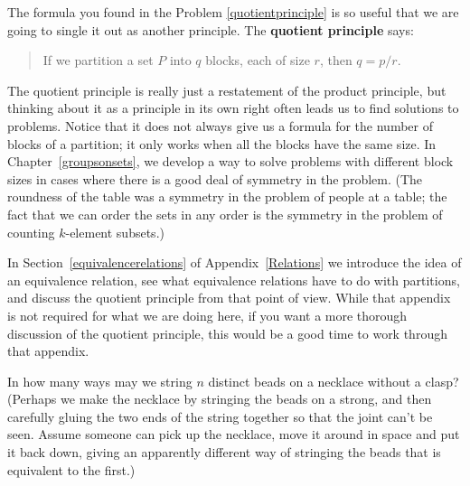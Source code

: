 The formula you found in the Problem \ref{quotientprinciple} is so useful that
we are going to single it out as another principle.  The {\bf quotient
principle} says: 
\begin{quote}If we partition a set $P$ 
into $q$ blocks, each of size $r$, then $q=p/r.$
\end{quote}
The quotient principle is really just a restatement of the product principle,
but thinking about it as a principle in its own right often leads us to find
solutions to problems.  Notice that it does not always give us a formula for
the number of blocks of a partition; it only works when all the blocks have
the same size. In Chapter~\ref{groupsonsets}, we develop a way to solve problems
with different block sizes in cases where there is a good deal of
symmetry in the problem. (The roundness of the table was a symmetry in
the problem of people at a table; the fact that we can order the sets
in any order is the symmetry in the problem of counting $k$-element subsets.)

In Section~\ref{equivalencerelations} of Appendix~\ref{Relations} we
introduce the idea of an equivalence relation, see what equivalence relations
have to do with partitions, and discuss the quotient principle from that
point of view.  While that appendix is not required for what we are doing
here, if you want a more thorough discussion of the quotient principle, this
would be a good time to work through that appendix.

\bp
\itemei In how many ways may we string $n$ distinct beads on a necklace
without a clasp? (Perhaps we make the necklace by stringing the beads
on a strong, and then carefully gluing the two ends of the string
together so that the joint can't be seen. Assume someone can pick up the necklace,
move it around in space and put it back down, giving an
apparently different way of stringing the beads that is
equivalent to the first.)\label{necklace}

